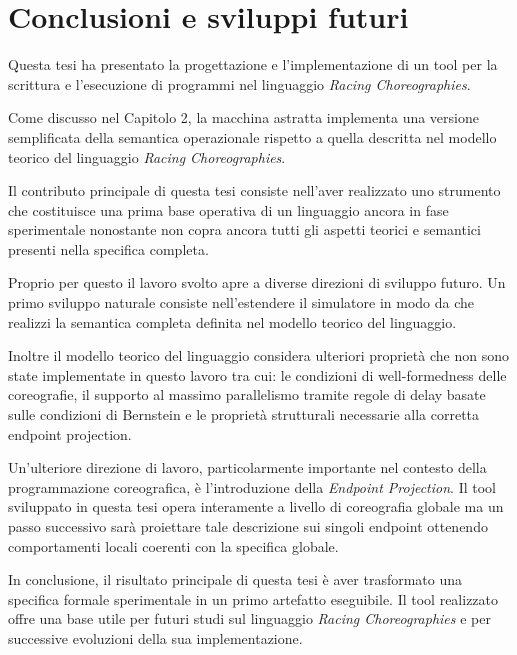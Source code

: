 \chapter{Conclusioni e sviluppi futuri}

Questa tesi ha presentato la progettazione e l’implementazione di un tool per la scrittura e l’esecuzione di programmi nel linguaggio \textit{Racing Choreographies}.

Come discusso nel Capitolo 2, la macchina astratta implementa una versione semplificata della semantica operazionale rispetto a quella descritta nel modello teorico del linguaggio \textit{Racing Choreographies}.

Il contributo principale di questa tesi consiste nell’aver realizzato uno strumento che costituisce una prima base operativa di un linguaggio ancora in fase sperimentale nonostante non copra ancora tutti gli aspetti teorici e semantici presenti nella specifica completa.

Proprio per questo il lavoro svolto apre a diverse direzioni di sviluppo futuro. Un primo sviluppo naturale consiste nell’estendere il simulatore in modo da che realizzi la semantica completa definita nel modello teorico del linguaggio.

Inoltre il modello teorico del linguaggio considera ulteriori proprietà che non sono state implementate in questo lavoro tra cui: le condizioni di well-formedness delle coreografie, il supporto al massimo parallelismo tramite regole di delay basate sulle condizioni di Bernstein e le proprietà strutturali necessarie alla corretta endpoint projection.

Un’ulteriore direzione di lavoro, particolarmente importante nel contesto della programmazione coreografica, è l’introduzione della \textit{Endpoint Projection}. Il tool sviluppato in questa tesi opera interamente a livello di coreografia globale ma un passo successivo sarà proiettare tale descrizione sui singoli endpoint ottenendo comportamenti locali coerenti con la specifica globale.

In conclusione, il risultato principale di questa tesi è aver trasformato una specifica formale sperimentale in un primo artefatto eseguibile. Il tool realizzato offre una base utile per futuri studi sul linguaggio \textit{Racing Choreographies} e per successive evoluzioni della sua implementazione.